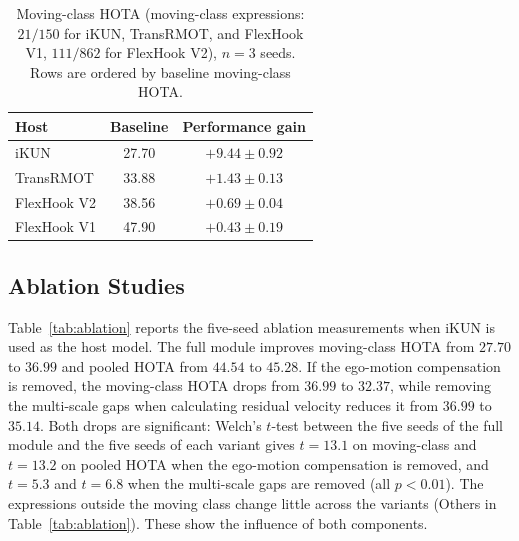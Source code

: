 \documentclass{article}
\begin{document}
\begin{table}[t]
  \centering
  \caption{Moving-class HOTA (moving-class expressions: $21/150$ for iKUN, TransRMOT, and FlexHook V1, $111/862$ for FlexHook V2), $n{=}3$ seeds. Rows are ordered by baseline moving-class HOTA.}
  \label{tab:deficit}
  \small
  \setlength{\tabcolsep}{2pt}
  \begin{tabular*}{\linewidth}{@{\extracolsep{\fill}}lcc}
    \hline
    Host        & Baseline & Performance gain \\
    \hline
    iKUN        & 27.70    & $+9.44\pm0.92$   \\
    TransRMOT   & 33.88    & $+1.43\pm0.13$   \\
    FlexHook V2 & 38.56    & $+0.69\pm0.04$   \\
    FlexHook V1 & 47.90    & $+0.43\pm0.19$   \\
    \hline
  \end{tabular*}
\end{table}

\subsection{Ablation Studies}
\label{sec:ablation}
Table~\ref{tab:ablation} reports the five-seed ablation measurements when iKUN is used as the host model. The full module improves moving-class HOTA from $27.70$ to $36.99$ and pooled HOTA from $44.54$ to $45.28$. If the ego-motion compensation is removed, the moving-class HOTA drops from $36.99$ to $32.37$, while removing the multi-scale gaps when calculating residual velocity reduces it from $36.99$ to $35.14$. Both drops are significant: Welch's $t$-test between the five seeds of the full module and the five seeds of each variant gives $t{=}13.1$ on moving-class and $t{=}13.2$ on pooled HOTA when the ego-motion compensation is removed, and $t{=}5.3$ and $t{=}6.8$ when the multi-scale gaps are removed (all $p{<}0.01$). The expressions outside the moving class change little across the variants (Others in Table~\ref{tab:ablation}). These show the influence of both components.
\end{document}
